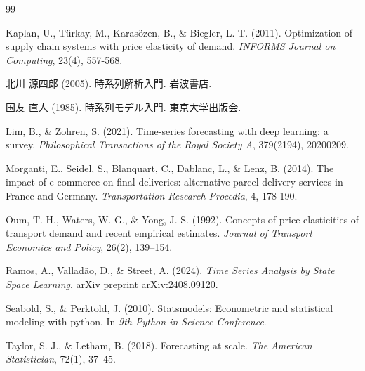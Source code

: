 \documentclass{bcsj}
\begin{document}
\begin{thebibliography}{99}


Kaplan, U., T{\"u}rkay, M., Karas{\"o}zen, B., \& Biegler, L. T. (2011).
Optimization of supply chain systems with price elasticity of demand.
\textit{INFORMS Journal on Computing}, 23(4), 557-568.

北川 源四郎 (2005). 時系列解析入門. 岩波書店.

国友 直人 (1985). 時系列モデル入門. 東京大学出版会.


Lim, B., \& Zohren, S. (2021). Time-series forecasting with deep learning: a survey. 
\textit{Philosophical Transactions of the Royal Society A}, 379(2194), 20200209.

Morganti, E., Seidel, S., Blanquart, C., Dablanc, L., \& Lenz, B. (2014).
The impact of e-commerce on final deliveries: alternative parcel delivery services in France and Germany.
\textit{Transportation Research Procedia}, 4, 178-190.

Oum, T. H., Waters, W. G., \& Yong, J. S. (1992).
Concepts of price elasticities of transport demand and recent empirical estimates. 
\textit{Journal of Transport Economics and Policy}, 26(2), 139--154.

Ramos, A., Valladão, D., \& Street, A. (2024). 
\textit{Time Series Analysis by State Space Learning}. 
arXiv preprint arXiv:2408.09120.

Seabold, S., \& Perktold, J. (2010). Statsmodels: Econometric and statistical modeling with python. 
In \textit{9th Python in Science Conference}.

Taylor, S. J., \& Letham, B. (2018).
Forecasting at scale. 
\textit{The American Statistician}, 72(1), 37--45.


\end{thebibliography}
\end{document}
